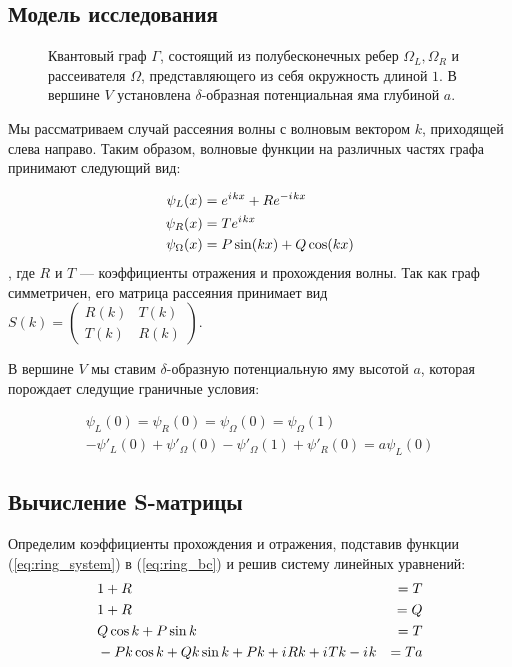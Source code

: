 \subsection{Модель исследования}
\begin{figure}[!htb] %
\centering
\begin{tikzpicture}[scale=1.1] %

\end{tikzpicture}
\caption{Квантовый граф $\Gamma$, состоящий из полубесконечных ребер $\Omega_L, \Omega_R$ и рассеивателя $\Omega$, представляющего из себя окружность длиной $1$. В вершине $V$ установлена $\delta$-образная потенциальная яма глубиной $a$.}
\end{figure}

Мы рассматриваем случай рассеяния волны с волновым вектором $k$, приходящей слева направо. Таким образом, волновые функции на различных частях графа принимают следующий вид:

\begin{equation}\label{eq:ring_system}
\begin{aligned}
\psi_L(x) &= \eexp{\iu k x} + R \eexp{-\iu k x} \\
\psi_R(x) &= T \eexp{\iu k x}\\
\psi_\Omega(x) &= P \sin(k x) + Q \cos(k x)
\end{aligned}
\end{equation}
, где $R$ и $T$ — коэффициенты отражения и прохождения волны. Так как граф симметричен, его матрица рассеяния принимает вид
$S(k) = \begin{pmatrix} R(k) & T(k) \\ T(k) & R(k) \end{pmatrix}$.

В вершине $V$ мы ставим $\delta$-образную потенциальную яму высотой $a$, которая порождает следущие граничные условия:

\begin{equation}\label{eq:ring_bc}
\begin{aligned}
\psi_L(0) = \psi_R(0) = \psi_\Omega(0) = \psi_\Omega(1) \\ 
-\psi'_L(0) + \psi'_\Omega(0) - \psi'_\Omega(1) + \psi'_R(0) = a \psi_L(0)
\end{aligned}
\end{equation}


\subsection{Вычисление S-матрицы}
Определим коэффициенты прохождения и отражения, подставив функции (\ref{eq:ring_system}) в (\ref{eq:ring_bc}) и решив систему линейных уравнений:
\begin{align*}
& 1 + R &= T \\
& 1 + R &= Q \\
& Q \cos k + P \sin k &= T \\
& -P k \cos k + Q k \sin k + P k + \iu R k + \iu T k - \iu k &= T a
\end{align*}

